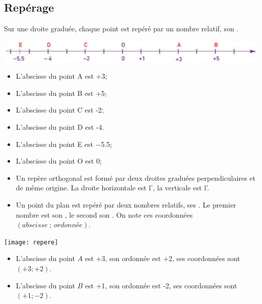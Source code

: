 \subsection{Repérage}

\begin{mydef}
	Sur une droite graduée, chaque point est repéré par un nombre relatif, son .
\end{mydef}


\begin{myex}
	\begin{center}
		\includegraphics[scale=0.5]{img/droite2}		
	\end{center}

	\begin{multicols}{2}
		\begin{itemize}
		\item L'abscisse du point A est +3;
		\item L'abscisse du point B est +5;
		\item L'abscisse du point C est -2;
		\item L'abscisse du point D est -4.
		\item L'abscisse du point E est \num{-5.5};
		\item L'abscisse du point O est 0;
	\end{itemize}
	\end{multicols}
\end{myex}


\begin{mydefs}
	\begin{itemize}
		\item Un repère orthogonal est formé par deux droites graduées perpendiculaires et de même origine. La droite horizontale est l', la verticale est l'.
		
		\item Un point du plan est repéré par deux nombres relatifs, ses . Le premier nombre est son , le second son . On note ces coordonnées $(abscisse \: ; \: ordonnée)$.
	\end{itemize}
\end{mydefs}


\begin{myexs}
	
		\begin{center}
			\texttt{[image: repere]}
		\end{center}
	

	\begin{itemize}
		\item L'abscisse du point $A$ est +3, son ordonnée est +2, ses coordonnées sont $(+3; +2)$.
		
		\item L'abscisse du point $B$ est +1, son ordonnée est -2, ses coordonnées sont $(+1; -2)$.
	\end{itemize}

\end{myexs}


